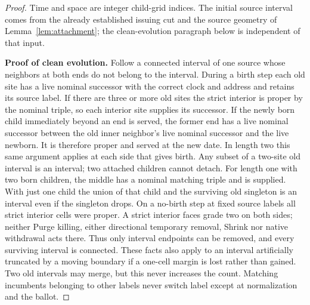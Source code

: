 \begin{proof}
Time and space are integer child-grid indices. The initial source interval comes from the already established issuing cut and the source geometry of Lemma~\ref{lem:attachment}; the clean-evolution paragraph below is independent of that input.



\textbf{Proof of clean evolution.} Follow a connected interval of one source whose neighbors at both ends do not belong to the interval. During a birth step each old site has a live nominal successor with the correct clock and address and retains its source label. If there are three or more old sites the strict interior is proper by the nominal triple, so each interior site supplies its successor. If the newly born child immediately beyond an end is served, the former end has a live nominal successor between the old inner neighbor's live nominal successor and the live newborn. It is therefore proper and served at the new date. In length two this same argument applies at each side that gives birth. Any subset of a two-site old interval is an interval; two attached children cannot detach. For length one with two born children, the middle has a nominal matching triple and is supplied. With just one child the union of that child and the surviving old singleton is an interval even if the singleton drops. On a no-birth step at fixed source labels all strict interior cells were proper. A strict interior faces grade two on both sides; neither Purge killing, either directional temporary removal, Shrink nor native withdrawal acts there. Thus only interval endpoints can be removed, and every surviving interval is connected. These facts also apply to an interval artificially truncated by a moving boundary if a one-cell margin is lost rather than gained. Two old intervals may merge, but this never increases the count. Matching incumbents belonging to other labels never switch label except at normalization and the ballot.


\end{proof}

